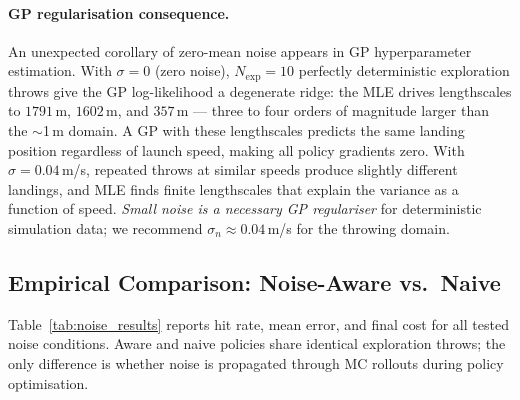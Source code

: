 \paragraph{GP regularisation consequence.}
An unexpected corollary of zero-mean noise appears in GP hyperparameter estimation.
With $\sigma = 0$ (zero noise), $N_{\mathrm{exp}} = 10$ perfectly deterministic
exploration throws give the GP log-likelihood a degenerate ridge: the MLE drives
lengthscales to $1791$\,m, $1602$\,m, and $357$\,m — three to four orders of magnitude
larger than the $\sim$1\,m domain.
A GP with these lengthscales predicts the same landing position regardless of launch
speed, making all policy gradients zero.
With $\sigma = 0.04$\,m/s, repeated throws at similar speeds produce slightly different
landings, and MLE finds finite lengthscales that explain the variance as a function of
speed.
\emph{Small noise is a necessary GP regulariser} for deterministic simulation data; we
recommend $\sigma_n \approx 0.04$\,m/s for the throwing domain.

\subsection{Empirical Comparison: Noise-Aware vs.\ Naive}
\label{sec:study3:empirical}

Table~\ref{tab:noise_results} reports hit rate, mean error, and final cost for all
tested noise conditions.
Aware and naive policies share identical exploration throws; the only difference is
whether noise is propagated through MC rollouts during policy optimisation.

